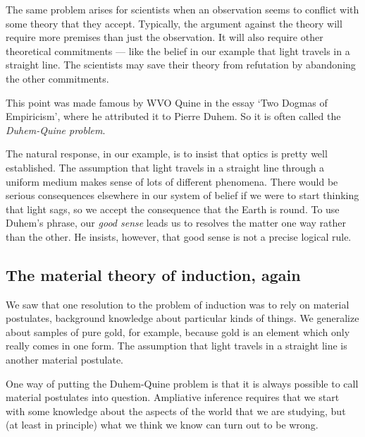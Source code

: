 \documentclass[]{article}
\begin{document}
The same problem arises for scientists when an observation seems to conflict with some theory that they accept. Typically, the argument against the theory will require more premises than just the observation. It will also require other theoretical commitments --- like the belief in our example that light travels in a straight line. The scientists may save their theory from refutation by abandoning the other commitments.

This point was made famous by WVO Quine in the essay `Two Dogmas of Empiricism', where he attributed it to Pierre Duhem. So it is often called the \emph{Duhem-Quine problem}. 

The natural response, in our example, is to insist that optics is pretty well established. The assumption that light travels in a straight line through a uniform medium makes sense of lots of different phenomena. There would be serious consequences elsewhere in our system of belief if we were to start thinking that light sags, so we accept the consequence that the Earth is round. To use Duhem's phrase, our \emph{good sense} leads us to resolves the matter one way rather than the other. He insists, however, that good sense is not a precise logical rule.

\subsection{The material theory of induction, again}

We saw that one resolution to the problem of induction was to rely on material postulates, background knowledge about particular kinds of things. We generalize about samples of pure gold, for example, because gold is an element which only really comes in one form. The assumption that light travels in a straight line is another material postulate.

One way of putting the Duhem-Quine problem is that it is always possible to call material postulates into question. Ampliative inference requires that we start with some knowledge about the aspects of the world that we are studying, but (at least in principle) what we think we know can turn out to be wrong.



\label{theend}
\end{document}
